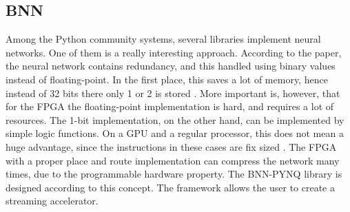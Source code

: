 \subsection{BNN} %
Among the Python community systems, several libraries implement neural networks.
One of them is a really interesting approach.
According to the paper, the neural network contains redundancy, and this handled using binary values instead of floating-point.
In the first place, this saves a lot of memory, hence instead of 32 bits there only 1 or 2 is stored \cite{NIPS2016_6573}.
More important is, however, that for the FPGA the floating-point implementation is hard, and requires a lot of resources.
The 1-bit implementation, on the other hand, can be implemented by simple logic functions.
On a GPU and a regular processor, this does not mean a huge advantage, since the instructions in these cases are fix sized \cite{7929192}.
The FPGA with a proper place and route implementation can compress the network many times, due to the programmable hardware property.
The BNN-PYNQ library \cite{finn} is designed according to this concept.
The framework allows the user to create a streaming accelerator.

\clearpage